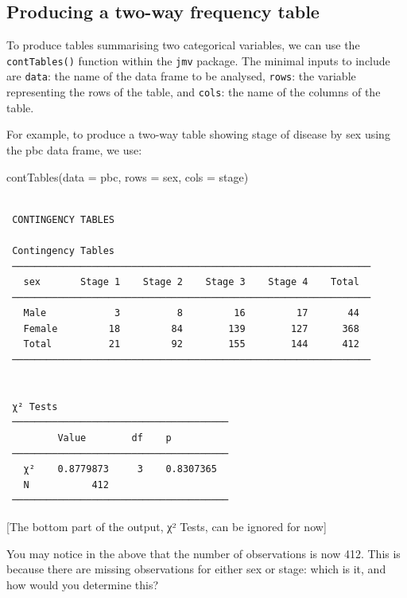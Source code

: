 \documentclass[
  a4paper,
]{memoir}
\newenvironment{Shaded}{\begin{snugshade}}{\end{snugshade}}
\newcommand{\AttributeTok}[1]{\textcolor[rgb]{0.00,0.00,0.00}{#1}}
\newcommand{\FunctionTok}[1]{\textcolor[rgb]{0.00,0.00,0.00}{#1}}
\newcommand{\NormalTok}[1]{\textcolor[rgb]{0.00,0.00,0.00}{#1}}
\begin{document}
\subsection{Producing a two-way frequency
table}\label{producing-a-two-way-frequency-table-1}

To produce tables summarising two categorical variables, we can use the
\texttt{contTables()} function within the \texttt{jmv} package. The
minimal inputs to include are \texttt{data}: the name of the data frame
to be analysed, \texttt{rows}: the variable representing the rows of the
table, and \texttt{cols}: the name of the columns of the table.

For example, to produce a two-way table showing stage of disease by sex
using the pbc data frame, we use:

\begin{Shaded}
\begin{Highlighting}[]
\FunctionTok{contTables}\NormalTok{(}\AttributeTok{data =}\NormalTok{ pbc, }\AttributeTok{rows =}\NormalTok{ sex, }\AttributeTok{cols =}\NormalTok{ stage)}
\end{Highlighting}
\end{Shaded}

\begin{verbatim}

 CONTINGENCY TABLES

 Contingency Tables                                              
 ─────────────────────────────────────────────────────────────── 
   sex       Stage 1    Stage 2    Stage 3    Stage 4    Total   
 ─────────────────────────────────────────────────────────────── 
   Male            3          8         16         17       44   
   Female         18         84        139        127      368   
   Total          21         92        155        144      412   
 ─────────────────────────────────────────────────────────────── 


 χ² Tests                               
 ────────────────────────────────────── 
         Value        df    p           
 ────────────────────────────────────── 
   χ²    0.8779873     3    0.8307365   
   N           412                      
 ────────────────────────────────────── 
\end{verbatim}

{[}The bottom part of the output, χ² Tests, can be ignored for now{]}

You may notice in the above that the number of observations is now 412.
This is because there are missing observations for either sex or stage:
which is it, and how would you determine this?
\end{document}
